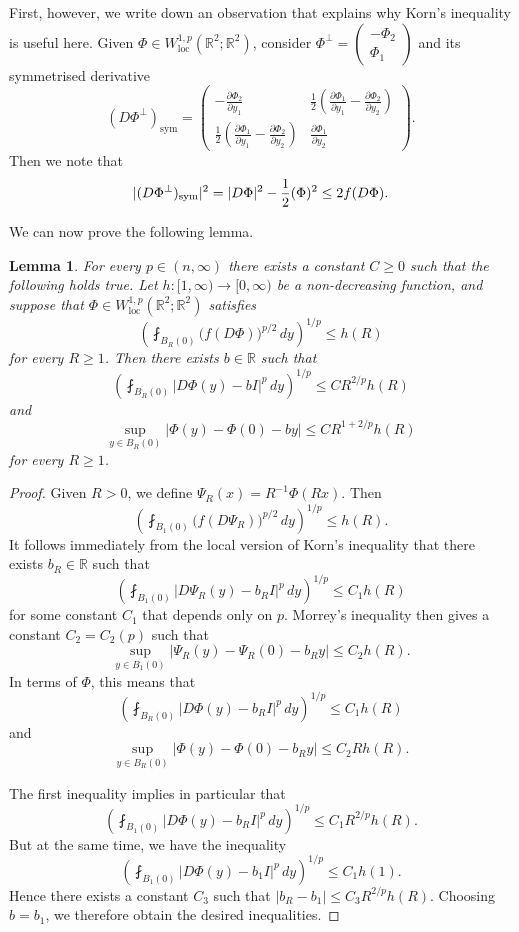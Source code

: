 \documentclass[a4paper]{article}
\newcommand{\R}{\mathbb{R}}
\newcommand{\sym}{\mathrm{sym}}
\newcommand{\loc}{\mathrm{loc}}
\let\div\relax\DeclareMathOperator{\div}{div}
\newcommand{\dd}[2]{\frac{\partial #1}{\partial #2}}
\newtheorem{lemma}[theorem]{Lemma}
\theoremstyle{definition}
\theoremstyle{remark}
\begin{document}
First, however, we write down an observation that explains why Korn's
inequality is useful here. Given $\Phi \in W_\loc^{1, p}(\R^2; \R^2)$,
consider $\Phi^\perp = (\begin{smallmatrix} -\Phi_2 \\ \Phi_1 \end{smallmatrix})$
and its symmetrised derivative
\[
(D\Phi^\perp)_\sym = \begin{pmatrix}
-\dd{\Phi_2}{y_1} & \frac{1}{2} \left(\dd{\Phi_1}{y_1} - \dd{\Phi_2}{y_2}\right) \\ \frac{1}{2} \left(\dd{\Phi_1}{y_1} - \dd{\Phi_2}{y_2}\right) & \dd{\Phi_1}{y_2}
\end{pmatrix}.
\]
Then we note that
\[
|(D\Phi^\perp)_\sym|^2 = |D\Phi|^2 - \frac{1}{2} (\div \Phi)^2 \le 2f(D\Phi).
\]

We can now prove the following lemma.

\begin{lemma} \label{lem:Korn}
For every $p \in (n, \infty)$ there exists a constant $C \ge 0$ such
that the following holds true.
Let $h \colon [1, \infty) \to [0, \infty)$ be a non-decreasing function,
and suppose that $\Phi \in W_\loc^{1, p}(\R^2; \R^2)$ satisfies
\[
\left(\fint_{B_R(0)} \bigl(f(D\Phi)\bigr)^{p/2} \, dy\right)^{1/p} \le h(R)
\]
for every $R \ge 1$. Then there exists $b \in \R$ such that
\[
\left(\fint_{B_R(0)} \left|D\Phi(y) - bI\right|^p \, dy\right)^{1/p} \le C R^{2/p} h(R)
\]
and
\[
\sup_{y \in B_R(0)} |\Phi(y) - \Phi(0) - by| \le CR^{1 + 2/p} h(R)
\]
for every $R \ge 1$.
\end{lemma}

\begin{proof}
Given $R > 0$, we define $\Psi_R(x) = R^{-1} \Phi(Rx)$. Then
\[
\left(\fint_{B_1(0)} \bigl(f(D\Psi_R)\bigr)^{p/2} \, dy\right)^{1/p} \le h(R).
\]
It follows immediately from the local version of Korn's inequality
\cite[\S 2, Theorem 8]{Kondratev-Oleinik:88} that there exists $b_R \in \R$
such that
\[
\left(\fint_{B_1(0)} \left|D\Psi_R(y) - b_R I\right|^p \, dy\right)^{1/p} \le C_1 h(R)
\]
for some constant $C_1$ that depends only on $p$. Morrey's inequality then gives a constant
$C_2 = C_2(p)$ such that
\[
\sup_{y \in B_1(0)} |\Psi_R(y) - \Psi_R(0) - b_Ry| \le C_2 h(R).
\]
In terms of $\Phi$, this means that
\[
\left(\fint_{B_R(0)} \left|D\Phi(y) - b_R I\right|^p \, dy\right)^{1/p} \le C_1 h(R)
\]
and
\[
\sup_{y \in B_R(0)} |\Phi(y) - \Phi(0) - b_Ry| \le C_2 Rh(R).
\]

The first inequality implies in particular that
\[
\left(\fint_{B_1(0)} \left|D\Phi(y) - b_R I\right|^p \, dy\right)^{1/p} \le C_1 R^{2/p} h(R).
\]
But at the same time, we have the inequality
\[
\left(\fint_{B_1(0)} \left|D\Phi(y) - b_1 I\right|^p \, dy\right)^{1/p} \le C_1 h(1).
\]
Hence there exists a constant $C_3$ such that $|b_R - b_1| \le C_3 R^{2/p} h(R)$. Choosing $b = b_1$, we therefore obtain the desired inequalities.
\end{proof}
\end{document}

